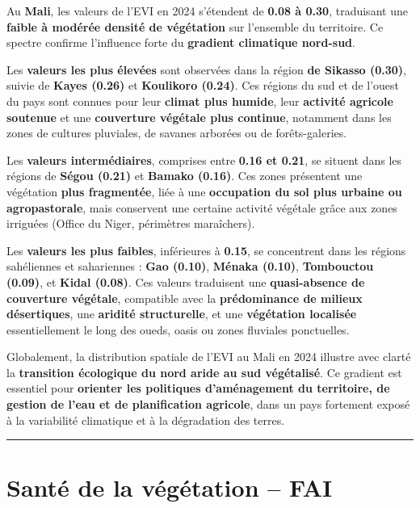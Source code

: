 \documentclass[
]{book}
\begin{document}
Au \textbf{Mali}, les valeurs de l'EVI en 2024 s'étendent de \textbf{0.08 à 0.30}, traduisant une \textbf{faible à modérée densité de végétation} sur l'ensemble du territoire. Ce spectre confirme l'influence forte du \textbf{gradient climatique nord-sud}.

Les \textbf{valeurs les plus élevées} sont observées dans la région \textbf{de Sikasso (0.30)}, suivie de \textbf{Kayes (0.26)} et \textbf{Koulikoro (0.24)}. Ces régions du sud et de l'ouest du pays sont connues pour leur \textbf{climat plus humide}, leur \textbf{activité agricole soutenue} et une \textbf{couverture végétale plus continue}, notamment dans les zones de cultures pluviales, de savanes arborées ou de forêts-galeries.

Les \textbf{valeurs intermédiaires}, comprises entre \textbf{0.16 et 0.21}, se situent dans les régions de \textbf{Ségou (0.21)} et \textbf{Bamako (0.16)}. Ces zones présentent une végétation \textbf{plus fragmentée}, liée à une \textbf{occupation du sol plus urbaine ou agropastorale}, mais conservent une certaine activité végétale grâce aux zones irriguées (Office du Niger, périmètres maraîchers).

Les \textbf{valeurs les plus faibles}, inférieures à \textbf{0.15}, se concentrent dans les régions sahéliennes et sahariennes : \textbf{Gao (0.10)}, \textbf{Ménaka (0.10)}, \textbf{Tombouctou (0.09)}, et \textbf{Kidal (0.08)}. Ces valeurs traduisent une \textbf{quasi-absence de couverture végétale}, compatible avec la \textbf{prédominance de milieux désertiques}, une \textbf{aridité structurelle}, et une \textbf{végétation localisée} essentiellement le long des oueds, oasis ou zones fluviales ponctuelles.

Globalement, la distribution spatiale de l'EVI au Mali en 2024 illustre avec clarté la \textbf{transition écologique du nord aride au sud végétalisé}. Ce gradient est essentiel pour \textbf{orienter les politiques d'aménagement du territoire, de gestion de l'eau et de planification agricole}, dans un pays fortement exposé à la variabilité climatique et à la dégradation des terres.

\begin{center}\rule{0.5\linewidth}{0.5pt}\end{center}

\section{Santé de la végétation -- FAI}\label{santuxe9-de-la-vuxe9guxe9tation-fai}
\end{document}
